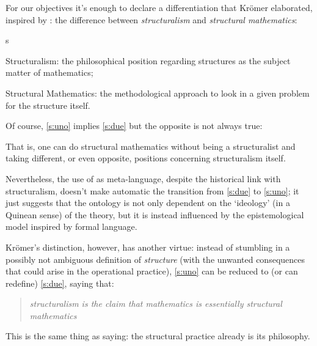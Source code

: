 For our objectives it's enough to declare a differentiation that Kr\"omer
elaborated, inspired by \cite{Cor96}: the difference between \emph{structuralism} and \emph{structural mathematics}:
\begin{enumtag}{s}
    \item \label{s:uno} Structuralism: the philosophical position regarding structures as the subject matter of mathematics;
    \item \label{s:due} Structural Mathematics: the methodological approach to look in a given problem for the structure itself.
\end{enumtag}
Of course, \ref{s:uno} implies \ref{s:due} but the opposite is not always true:
\begin{remark} \label{weak_structuralism}
    That is, one can do structural mathematics without being a structuralist and taking different, or even opposite, positions concerning structuralism itself. 

    Nevertheless, the use of \CT as meta-language, despite the historical link with structuralism, doesn't make automatic the transition from \ref{s:due} to \ref{s:uno}; it just suggests that the ontology is not only dependent on the `ideology' (in a Quinean sense) of the theory, but it is instead influenced by the epistemological model inspired by formal language.
\end{remark}
Kr\"omer's distinction, however, has another virtue: instead of stumbling in a possibly not ambiguous definition of \textit{structure} (with the unwanted consequences that could arise in the operational practice), \ref{s:uno} can be reduced to (or can redefine) \ref{s:due}, saying that:
\begin{quote}
    \emph{structuralism is the claim that mathematics
        is essentially structural mathematics} \cite{kromer2007tool}
\end{quote}
This is the same thing as saying: the structural practice already is its philosophy.

